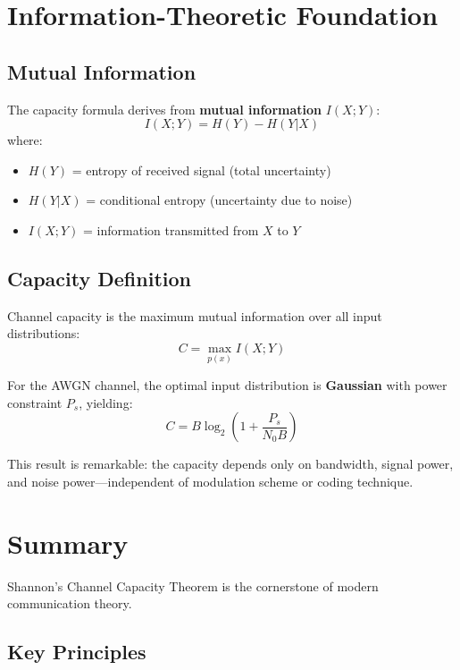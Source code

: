 \section{Information-Theoretic Foundation}

\subsection{Mutual Information}

The capacity formula derives from \textbf{mutual information} $I(X;Y)$:
\begin{equation}
I(X;Y) = H(Y) - H(Y|X)
\end{equation}
where:
\begin{itemize}
\item $H(Y)$ = entropy of received signal (total uncertainty)
\item $H(Y|X)$ = conditional entropy (uncertainty due to noise)
\item $I(X;Y)$ = information transmitted from $X$ to $Y$
\end{itemize}

\subsection{Capacity Definition}

Channel capacity is the maximum mutual information over all input distributions:
\begin{equation}
C = \max_{p(x)} I(X;Y)
\label{eq:capacity-definition}
\end{equation}

For the AWGN channel, the optimal input distribution is \textbf{Gaussian} with power constraint $P_s$, yielding:
\begin{equation}
C = B \log_2\left(1 + \frac{P_s}{N_0 B}\right)
\end{equation}

This result is remarkable: the capacity depends only on bandwidth, signal power, and noise power---independent of modulation scheme or coding technique.

\section{Summary}

Shannon's Channel Capacity Theorem is the cornerstone of modern communication theory.

\subsection{Key Principles}

